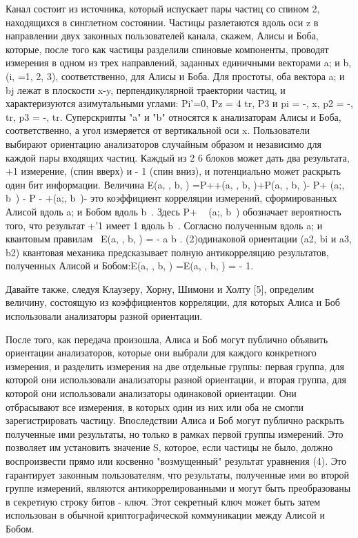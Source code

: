 Канал состоит из источника, который испускает пары частиц со спином 2, находящихся в синглетном состоянии. Частицы разлетаются вдоль оси z в направлении двух законных пользователей канала, скажем, Алисы и Боба, которые, после того как частицы разделили спиновые компоненты, проводят измерения в одном из трех направлений, заданных единичными векторами a; и b, (i, =1, 2, 3), соответственно, для Алисы и Боба. Для простоты, оба вектора a; и bj лежат в плоскости x-y, перпендикулярной траектории частиц, и характеризуются азимутальными углами: Pi'=0, Pz = 4 tr, P3 и pi = -, x, p2 = -, tr, p3 = -, tr. Суперскрипты "a" и "b" относятся к анализаторам Алисы и Боба, соответственно, а угол измеряется от вертикальной оси x. Пользователи выбирают ориентацию анализаторов случайным образом и независимо для каждой пары входящих частиц. Каждый из 2 6 блоков может дать два результата, +1 измерение, (спин вверх) и - 1 (спин вниз), и потенциально может раскрыть один бит информации.
Величина E(a, , b, ) =P++(a, , b, )+P(a, , b, )- P+ (a;, b~) - P - +(a;, b~)- это коэффициент корреляции измерений, сформированных Алисой вдоль a; и Бобом вдоль b~. Здесь P+ ~ (a;, b~) обозначает вероятность того, что результат +'1 имеет 1 вдоль b~. Согласно полученным вдоль a; и квантовым правилам~ E(a, , b, ) = - a b . (2)одинаковой ориентации (a2, bi и a3, b2) квантовая механика предсказывает полную антикорреляцию результатов, полученных Алисой и Бобом:E(a, , b, ) =E(a, , b, ) = - 1.

Давайте также, следуя Клаузеру, Хорну, Шимони и Холту [5], определим величину, состоящую из коэффициентов корреляции, для которых Алиса и Боб использовали анализаторы разной ориентации.

После того, как передача произошла, Алиса и Боб могут публично объявить ориентации анализаторов, которые они выбрали для каждого конкретного измерения, и разделить измерения на две отдельные группы: первая группа, для которой они использовали анализаторы разной ориентации, и вторая группа, для которой они использовали анализаторы одинаковой ориентации. Они отбрасывают все измерения, в которых один из них или оба не смогли зарегистрировать частицу. Впоследствии Алиса и Боб могут публично раскрыть полученные ими результаты, но только в рамках первой группы измерений. Это позволяет им установить значение S, которое, если частицы не было, должно воспроизвести прямо или косвенно "возмущенный" результат уравнения (4). Это гарантирует законным пользователям, что результаты, полученные ими во второй группе измерений, являются антикоррелированными и могут быть преобразованы в секретную строку битов - ключ. Этот секретный ключ может быть затем использован в обычной криптографической коммуникации между Алисой и Бобом.

